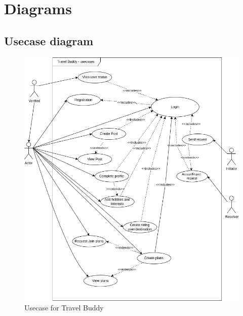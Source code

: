 \documentclass[12pt,a4paper]{report}
\begin{document}
\chapter{Diagrams}

\section{Usecase diagram}
\begin{figure}
    \centering
    \includegraphics[width=\textwidth, keepaspectratio]{figures/usecase.png}
    \caption{Usecase for Travel Buddy}
    \label{fig:usecase}
\end{figure}
\end{document}
